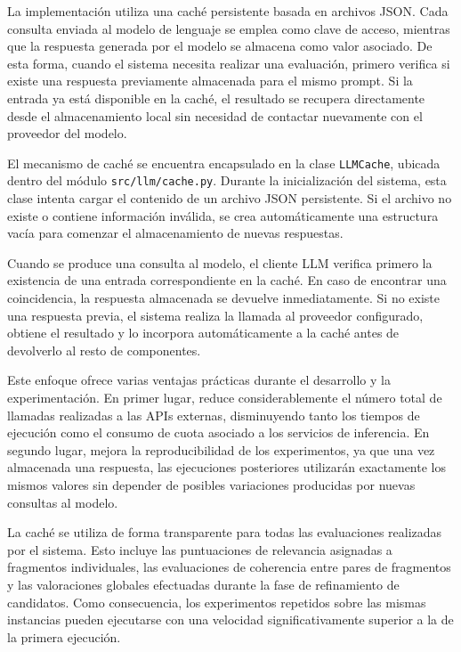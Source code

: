 \documentclass[12pt,a4paper]{article}
\begin{document}
La implementación utiliza una caché persistente basada en archivos JSON. Cada consulta enviada al modelo de lenguaje se emplea como clave de acceso, mientras que la respuesta generada por el modelo se almacena como valor asociado. De esta forma, cuando el sistema necesita realizar una evaluación, primero verifica si existe una respuesta previamente almacenada para el mismo prompt. Si la entrada ya está disponible en la caché, el resultado se recupera directamente desde el almacenamiento local sin necesidad de contactar nuevamente con el proveedor del modelo.

El mecanismo de caché se encuentra encapsulado en la clase \texttt{LLMCache}, ubicada dentro del módulo \texttt{src/llm/cache.py}. Durante la inicialización del sistema, esta clase intenta cargar el contenido de un archivo JSON persistente. Si el archivo no existe o contiene información inválida, se crea automáticamente una estructura vacía para comenzar el almacenamiento de nuevas respuestas.

Cuando se produce una consulta al modelo, el cliente LLM verifica primero la existencia de una entrada correspondiente en la caché. En caso de encontrar una coincidencia, la respuesta almacenada se devuelve inmediatamente. Si no existe una respuesta previa, el sistema realiza la llamada al proveedor configurado, obtiene el resultado y lo incorpora automáticamente a la caché antes de devolverlo al resto de componentes.

Este enfoque ofrece varias ventajas prácticas durante el desarrollo y la experimentación. En primer lugar, reduce considerablemente el número total de llamadas realizadas a las APIs externas, disminuyendo tanto los tiempos de ejecución como el consumo de cuota asociado a los servicios de inferencia. En segundo lugar, mejora la reproducibilidad de los experimentos, ya que una vez almacenada una respuesta, las ejecuciones posteriores utilizarán exactamente los mismos valores sin depender de posibles variaciones producidas por nuevas consultas al modelo.

La caché se utiliza de forma transparente para todas las evaluaciones realizadas por el sistema. Esto incluye las puntuaciones de relevancia asignadas a fragmentos individuales, las evaluaciones de coherencia entre pares de fragmentos y las valoraciones globales efectuadas durante la fase de refinamiento de candidatos. Como consecuencia, los experimentos repetidos sobre las mismas instancias pueden ejecutarse con una velocidad significativamente superior a la de la primera ejecución.
\end{document}
